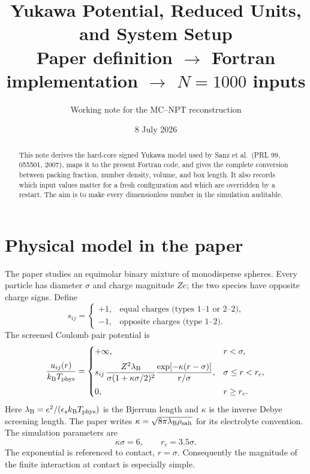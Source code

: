 \documentclass[11pt,a4paper]{article}
\title{Yukawa Potential, Reduced Units, and System Setup\\
\large Paper definition $\rightarrow$ Fortran implementation $\rightarrow$ $N=1000$ inputs}
\author{Working note for the MC--NPT reconstruction}
\date{8 July 2026}
\newcommand{\sgnq}{s_{ij}}
\begin{document}
\maketitle
\begin{abstract}
This note derives the hard-core signed Yukawa model used by Sanz et al.\ (PRL
99, 055501, 2007), maps it to the present Fortran code, and gives the complete
conversion between packing fraction, number density, volume, and box length.
It also records which input values matter for a fresh configuration and which
are overridden by a restart.  The aim is to make every dimensionless number in
the simulation auditable.
\end{abstract}
\tableofcontents

\section{Physical model in the paper}
The paper studies an equimolar binary mixture of monodisperse spheres.  Every
particle has diameter $\sigma$ and charge magnitude $Ze$; the two species have
opposite charge signs.  Define
\begin{equation}
  \sgnq = \begin{cases}
  +1,&\text{equal charges (types 1--1 or 2--2)},\\
  -1,&\text{opposite charges (type 1--2)}.
  \end{cases}
\end{equation}
The screened Coulomb pair potential is
\begin{equation}
\frac{u_{ij}(r)}{k_{\mathrm B}T_{\rm phys}}=
\begin{cases}
+\infty, & r<\sigma,\\[2mm]
\displaystyle \sgnq\,
\frac{Z^2\lambda_{\mathrm B}}
{\sigma(1+\kappa\sigma/2)^2}
\frac{\exp[-\kappa(r-\sigma)]}{r/\sigma},
& \sigma\le r<r_c,\\[3mm]
0,&r\ge r_c.
\end{cases}
\label{eq:paper-potential}
\end{equation}
Here $\lambda_{\mathrm B}=e^2/(\epsilon_s k_{\mathrm B}T_{\rm phys})$ is
the Bjerrum length and $\kappa$ is the inverse Debye screening length.  The
paper writes $\kappa=\sqrt{8\pi\lambda_{\mathrm B}\rho_{\rm salt}}$ for its
electrolyte convention.  The simulation parameters are
\begin{equation}
 \kappa\sigma=6, \qquad r_c=3.5\sigma.
\end{equation}
The exponential is referenced to contact, $r=\sigma$.  Consequently the
magnitude of the finite interaction at contact is especially simple.
\end{document}
